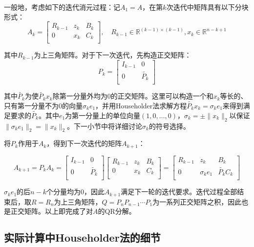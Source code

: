 ﻿\documentclass[UTF8,a4paper,openany]{ctexbook}
\theoremstyle{qrplain}
\begin{document}
一般地，考虑如下的迭代消元过程：记$A_1=A$，在第$k$次迭代中矩阵具有以下分块形式：
$$A_k=\left[\begin{matrix}R_{k-1}&z_k&B_k\\0&x_k&C_k\\\end{matrix}\right],\quad R_{k-1}\in\mathbb{R}^{(k-1)\times(k-1)},x_k\in\mathbb{R}^{n-k+1}$$

其中$R_{k-1}$为上三角矩阵。对于下一次迭代，先构造正交矩阵：
$$P_k=\left[\begin{matrix}I_{k-1}&0\\0&\widetilde{P_k}\\\end{matrix}\right]$$

其中$\widetilde{P_k}$为使$\widetilde{P_k}x_k$除第一分量外均为$0$的正交矩阵。这里可以构造一个和$x_k$等长的、只有第一分量不为$0$的向量$\sigma_k e_1$，并用Householder法求解方程$\widetilde{P_k}x_k=\sigma_k e_1$来得到满足要求的$\widetilde{P_k}$。其中$e_1$为第一分量上的单位向量$(1, 0, \ldots, 0)$，$\sigma_k=\pm\|x_k\|_2$以保证$\|\sigma_k e_1\|_2=\|x_k\|_2$。下一小节中将详细讨论$\sigma_k$的符号选择。

将$P_k$作用于$A_k$，得到下一次迭代的矩阵$A_{k+1}$：

$$A_{k+1}=P_kA_k=
\left[
  \begin{matrix}
    I_{k-1}&0\\
    0&\widetilde{P_k}\\
  \end{matrix}
\right]
\left[
  \begin{matrix}
    R_{k-1}&z_k&B_k\\
    0&x_k&C_k\\
  \end{matrix}
\right]
=\left[
  \begin{matrix}
    R_{k-1}&z_k&B_k\\
    0&\sigma_k e_1&\widetilde{P_k}C_k\\
  \end{matrix}
\right]
$$

$\sigma_k e_1$的后$n-k$个分量均为$0$，因此$A_{k+1}$满足下一轮的迭代要求。迭代过程全部结束后，取$R=R_n$为上三角矩阵，$Q=P_nP_{n-1}\cdots P_1$为一系列正交矩阵之积，因此也是正交矩阵。以上即完成了对$A$的QR分解。

\subsection{实际计算中Householder法的细节}
\end{document}
